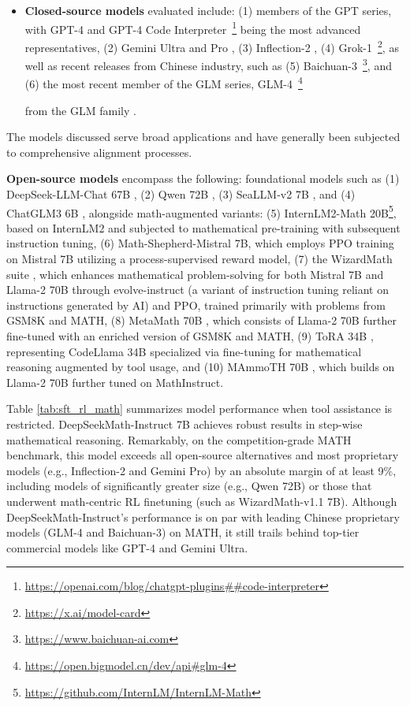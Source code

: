 \begin{itemize}[topsep=0pt]
    \item \textbf{Closed-source models} evaluated include: (1) members of the GPT series, with GPT-4 \citep{gpt4} and GPT-4 Code Interpreter~\footnote{\url{https://openai.com/blog/chatgpt-plugins\#\#code-interpreter}} being the most advanced representatives, (2) Gemini Ultra and Pro \citep{gemini}, (3) Inflection-2 \citep{inflection-2}, (4) Grok-1~\footnote{\url{https://x.ai/model-card}},
    as well as recent releases from Chinese industry, such as (5) Baichuan-3~\footnote{\url{https://www.baichuan-ai.com}},
    and (6) the most recent member of the GLM series, GLM-4~\footnote{\url{https://open.bigmodel.cn/dev/api\#glm-4}}

    from the GLM family \citep{glm}.
\end{itemize}

The models discussed serve broad applications and have generally been subjected to comprehensive alignment processes.

\item \textbf{Open-source models} encompass the following: foundational models such as (1) DeepSeek-LLM-Chat 67B \citep{deepseek-llm}, (2) Qwen 72B \citep{qwen}, (3) SeaLLM-v2 7B \citep{seallm}, and (4) ChatGLM3 6B \citep{chatglm3}, alongside math-augmented variants: (5) InternLM2-Math 20B\footnote{\url{https://github.com/InternLM/InternLM-Math}}, based on InternLM2 and subjected to mathematical pre-training with subsequent instruction tuning, (6) Math-Shepherd-Mistral 7B, which employs PPO training \citep{schulman2017proximal} on Mistral 7B \citep{mistral} utilizing a process-supervised reward model, (7) the WizardMath suite \citep{wizardmath}, which enhances mathematical problem-solving for both Mistral 7B and Llama-2 70B \citep{llama2} through evolve-instruct (a variant of instruction tuning reliant on instructions generated by AI) and PPO, trained primarily with problems from GSM8K and MATH, (8) MetaMath 70B \citep{metamath}, which consists of Llama-2 70B further fine-tuned with an enriched version of GSM8K and MATH, (9) ToRA 34B \cite{tora}, representing CodeLlama 34B specialized via fine-tuning for mathematical reasoning augmented by tool usage, and (10) MAmmoTH 70B \citep{MathInstruct}, which builds on Llama-2 70B further tuned on MathInstruct.

Table \ref{tab:sft_rl_math} summarizes model performance when tool assistance is restricted. DeepSeekMath-Instruct 7B achieves robust results in step-wise mathematical reasoning. Remarkably, on the competition-grade MATH benchmark, this model exceeds all open-source alternatives and most proprietary models (e.g., Inflection-2 and Gemini Pro) by an absolute margin of at least 9\%, including models of significantly greater size (e.g., Qwen 72B) or those that underwent math-centric RL finetuning (such as WizardMath-v1.1 7B). Although DeepSeekMath-Instruct's performance is on par with leading Chinese proprietary models (GLM-4 and Baichuan-3) on MATH, it still trails behind top-tier commercial models like GPT-4 and Gemini Ultra.

